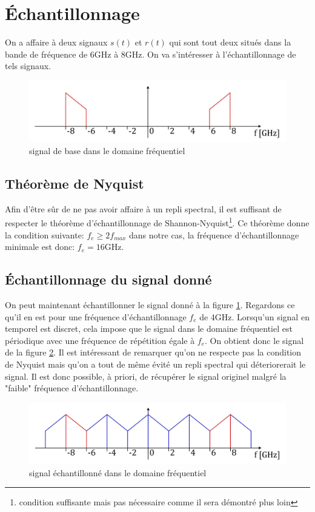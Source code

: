 \documentclass[10pt,a4paper]{article}
\begin{document}
\section{Échantillonnage}
On a affaire à deux signaux $s(t)$ et $r(t)$ qui sont tout deux situés dans la bande de fréquence de 6GHz à 8GHz. On va s'intéresser à l'échantillonnage de tels signaux.
\begin{figure}[h!]
\centering
\includegraphics[scale=0.2]{sig.jpg}
\caption{signal de base dans le domaine fréquentiel}
\label{sig}
\end{figure}
\subsection{Théorème de Nyquist}
Afin d'être sûr de ne pas avoir affaire à un repli spectral, il est suffisant de respecter le théorème d'échantillonnage de Shannon-Nyquist\footnote{condition suffisante mais pas nécessaire comme il sera démontré plus loin}. Ce théorème donne la condition suivante: $f_e\geqslant 2f_{max}$ dans notre cas, la fréquence d'échantillonnage minimale est donc: $f_e=16\text{GHz}$.
\subsection{Échantillonnage du signal donné}
On peut maintenant échantillonner le signal donné à la figure \ref{sig}. Regardons ce qu'il en est pour une fréquence d'échantillonnage $f_e$ de 4GHz. Lorsqu'un signal en temporel est discret, cela impose que le signal dans le domaine fréquentiel est périodique avec une fréquence de répétition égale à $f_e$. On obtient donc le signal de la figure \ref{sig2}. Il est intéressant de remarquer qu'on ne respecte pas la condition de Nyquist mais qu'on a tout de même évité un repli spectral qui déteriorerait le signal. Il est donc possible, à priori, de récupérer le signal originel malgré la "faible" fréquence d'échantillonnage.
\begin{figure}[h!]
\centering
\includegraphics[scale=0.2]{sig2.jpg}
\caption{signal échantillonné dans le domaine fréquentiel}
\label{sig2}
\end{figure}
\end{document}

